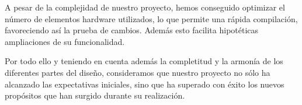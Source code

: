 \documentclass{article}
\begin{document}
	A pesar de la complejidad de nuestro proyecto, hemos conseguido optimizar el número de elementos hardware utilizados, lo que permite una rápida compilación, favoreciendo así la prueba de cambios. Además esto facilita hipotéticas ampliaciones de su funcionalidad.

	\medskip Por todo ello y teniendo en cuenta además la completitud y la armonía de los diferentes partes del diseño, consideramos que nuestro proyecto no sólo ha alcanzado las expectativas iniciales, sino que ha superado con éxito los nuevos propósitos que han surgido durante su realización.

\newpage
{} {}


\end{document}
